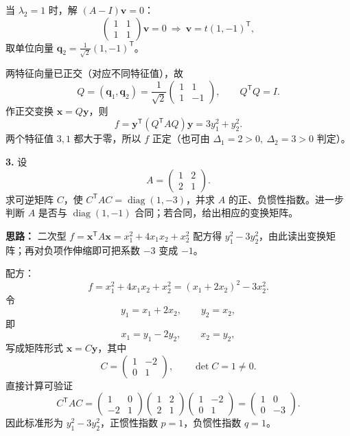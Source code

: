 当 \(\lambda_2=1\) 时，解 \((A-I)\mathbf{v}=0\)：
\[
\begin{pmatrix}1&1\\1&1\end{pmatrix}\mathbf{v}=0
\ \Longrightarrow\ \mathbf{v}=t(1,-1)^{\mathsf T},
\]
取单位向量 \(\mathbf{q}_2=\frac1{\sqrt2}(1,-1)^{\mathsf T}\)。

两特征向量已正交（对应不同特征值），故
\[
Q=(\mathbf{q}_1,\mathbf{q}_2)
=\frac1{\sqrt2}\begin{pmatrix}1&1\\1&-1\end{pmatrix},
\qquad Q^{\mathsf T}Q=I.
\]
作正交变换 \(\mathbf{x}=Q\mathbf{y}\)，则
\[
f=\mathbf{y}^{\mathsf T}(Q^{\mathsf T}AQ)\mathbf{y}
=3y_1^2+y_2^2.
\]
两个特征值 \(3,1\) 都大于零，所以 \(f\) 正定（也可由 \(\Delta_1=2>0,\ \Delta_2=3>0\) 判定）。

\else \answerarea[8] \fi%

\textbf{3.} 设
\[
A=\begin{pmatrix}1&2\\2&1\end{pmatrix}.
\]
求可逆矩阵 \(C\)，使 \(C^{\mathsf T}AC=\operatorname{diag}(1,-3)\)，并求 \(A\) 的正、负惯性指数。进一步判断 \(A\) 是否与 \(\operatorname{diag}(1,-1)\) 合同；若合同，给出相应的变换矩阵。

\ifshowsolutions%

\textbf{思路：} 二次型 \(f=\mathbf{x}^{\mathsf T}A\mathbf{x}=x_1^2+4x_1x_2+x_2^2\) 配方得 \(y_1^2-3y_2^2\)，由此读出变换矩阵；再对负项作伸缩即可把系数 \(-3\) 变成 \(-1\)。

配方：
\[
f=x_1^2+4x_1x_2+x_2^2=(x_1+2x_2)^2-3x_2^2.
\]
令
\[
y_1=x_1+2x_2,\qquad y_2=x_2,
\]
即
\[
x_1=y_1-2y_2,\qquad x_2=y_2,
\]
写成矩阵形式 \(\mathbf{x}=C\mathbf{y}\)，其中
\[
C=\begin{pmatrix}1&-2\\0&1\end{pmatrix},\qquad \det C=1\neq0.
\]
直接计算可验证
\[
C^{\mathsf T}AC
=\begin{pmatrix}1&0\\-2&1\end{pmatrix}
\begin{pmatrix}1&2\\2&1\end{pmatrix}
\begin{pmatrix}1&-2\\0&1\end{pmatrix}
=\begin{pmatrix}1&0\\0&-3\end{pmatrix}.
\]
因此标准形为 \(y_1^2-3y_2^2\)，正惯性指数 \(p=1\)，负惯性指数 \(q=1\)。

